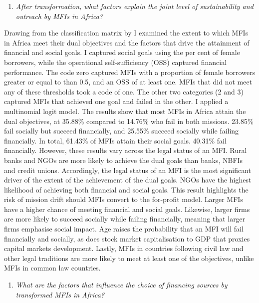 \documentclass[a4paper, nobind]{templates/ociamthesis}
\providecommand{\tightlist}{%
  \setlength{\itemsep}{0pt}\setlength{\parskip}{0pt}}
\begin{document}
\begin{enumerate}
\def\labelenumi{\arabic{enumi}.}
\setcounter{enumi}{3}
\tightlist
\item
  \emph{After transformation, what factors explain the joint level of sustainability and outreach by MFIs in Africa?}
\end{enumerate}

Drawing from the classification matrix by \textcite{chattopadhyay2017applicability} I examined the extent to which MFIs in Africa meet their dual objectives and the factors that drive the attainment of financial and social goals. I captured social goals using the per cent of female borrowers, while the operational self-sufficiency (OSS) captured financial performance. The code zero captured MFIs with a proportion of female borrowers greater or equal to than 0.5, and an OSS of at least one. MFIs that did not meet any of these thresholds took a code of one. The other two categories (2 and 3) captured MFIs that achieved one goal and failed in the other. I applied a multinomial logit model. The results show that most MFIs in Africa attain the dual objectives, at 35.88\% compared to 14.76\% who fail in both missions. 23.85\% fail socially but succeed financially, and 25.55\% succeed socially while failing financially. In total, 61.43\% of MFIs attain their social goals. 40.31\% fail financially. However, these results vary across the legal status of an MFI. Rural banks and NGOs are more likely to achieve the dual goals than banks, NBFIs and credit unions. Accordingly, the legal status of an MFI is the most significant driver of the extent of the achievement of the dual goals. NGOs have the highest likelihood of achieving both financial and social goals. This result highlights the risk of mission drift should MFIs convert to the for-profit model. Larger MFIs have a higher chance of meeting financial and social goals. Likewise, larger firms are more likely to succeed socially while failing financially, meaning that larger firms emphasise social impact. Age raises the probability that an MFI will fail financially and socially, as does stock market capitalisation to GDP that proxies capital markets development. Lastly, MFIs in countries following civil law and other legal traditions are more likely to meet at least one of the objectives, unlike MFIs in common law countries.

\begin{enumerate}
\def\labelenumi{\arabic{enumi}.}
\setcounter{enumi}{4}
\tightlist
\item
  \emph{What are the factors that influence the choice of financing sources by transformed MFIs in Africa?}
\end{enumerate}
\end{document}
